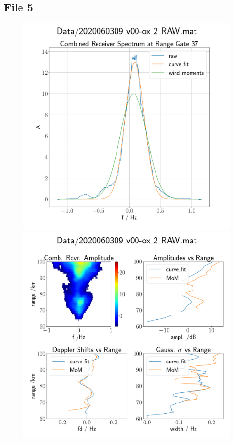 \subsection{File 5}
\begin{figure}[H]
  \begin{minipage}[t]{0.45\textwidth}
    \centering
    \includegraphics[width=\textwidth]{graphics/data_4_single_rg.pdf}
    \caption{}
  \end{minipage}\hfill
  \begin{minipage}[t]{0.45\textwidth}
    \centering
    \includegraphics[width=\textwidth]{graphics/data_4_quad.pdf}
    \caption{}
   \end{minipage}
\end{figure}
